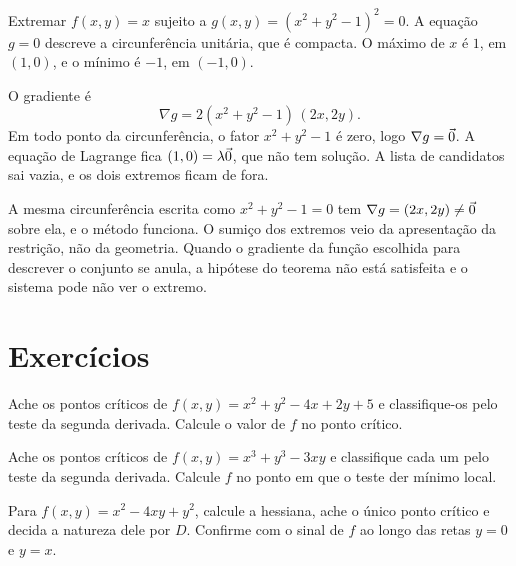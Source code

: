 \documentclass[11pt,a4paper]{article}
\begin{document}

\begin{exemplo}
Extremar $f(x,y)=x$ sujeito a $g(x,y)=(x^2+y^2-1)^2=0$. A equação $g=0$ descreve a circunferência unitária, que é compacta. O máximo de $x$ é $1$, em $(1,0)$, e o mínimo é $-1$, em $(-1,0)$.

O gradiente é
\[
\nabla g=2(x^2+y^2-1)\,(2x,2y).
\]
Em todo ponto da circunferência, o fator $x^2+y^2-1$ é zero, logo $\nabla g=\vec{0}$. A equação de Lagrange fica $(1,0)=\lambda\vec{0}$, que não tem solução. A lista de candidatos sai vazia, e os dois extremos ficam de fora.

A mesma circunferência escrita como $x^2+y^2-1=0$ tem $\nabla g=(2x,2y)\neq\vec{0}$ sobre ela, e o método funciona. O sumiço dos extremos veio da apresentação da restrição, não da geometria. Quando o gradiente da função escolhida para descrever o conjunto se anula, a hipótese do teorema não está satisfeita e o sistema pode não ver o extremo.
\end{exemplo}

\section{Exercícios}

\begin{exercicio}
Ache os pontos críticos de $f(x,y)=x^2+y^2-4x+2y+5$ e classifique-os pelo teste da segunda derivada. Calcule o valor de $f$ no ponto crítico.
\end{exercicio}

\begin{exercicio}
Ache os pontos críticos de $f(x,y)=x^3+y^3-3xy$ e classifique cada um pelo teste da segunda derivada. Calcule $f$ no ponto em que o teste der mínimo local.
\end{exercicio}

\begin{exercicio}
Para $f(x,y)=x^2-4xy+y^2$, calcule a hessiana, ache o único ponto crítico e decida a natureza dele por $D$. Confirme com o sinal de $f$ ao longo das retas $y=0$ e $y=x$.
\end{exercicio}
\end{document}
